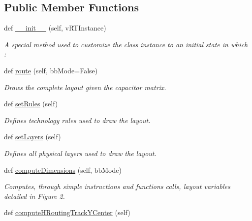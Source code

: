 \subsection*{Public Member Functions}
\begin{DoxyCompactItemize}
\item 
def \mbox{\hyperlink{classpython_1_1capacitorrouted_1_1RoutMatchedCapacitor_acb14d0c0bde8b81f13e2f4c773691d69}{\+\_\+\+\_\+init\+\_\+\+\_\+}} (self, v\+R\+T\+Instance)
\begin{DoxyCompactList}\small\item\em A special method used to customize the class instance to an initial state in which \+: \end{DoxyCompactList}\item 
def \mbox{\hyperlink{classpython_1_1capacitorrouted_1_1RoutMatchedCapacitor_a84f0757a2a026ece5364ae0cc0872ef2}{route}} (self, bb\+Mode=False)
\begin{DoxyCompactList}\small\item\em Draws the complete layout given the capacitor matrix. \end{DoxyCompactList}\item 
def \mbox{\hyperlink{classpython_1_1capacitorrouted_1_1RoutMatchedCapacitor_a458149b1404a0e797668330beb75b640}{set\+Rules}} (self)
\begin{DoxyCompactList}\small\item\em Defines technology rules used to draw the layout. \end{DoxyCompactList}\item 
def \mbox{\hyperlink{classpython_1_1capacitorrouted_1_1RoutMatchedCapacitor_a9fd411594953ae1c5be7025f258d4354}{set\+Layers}} (self)
\begin{DoxyCompactList}\small\item\em Defines all physical layers used to draw the layout. \end{DoxyCompactList}\item 
def \mbox{\hyperlink{classpython_1_1capacitorrouted_1_1RoutMatchedCapacitor_ac6ce841e559dc495eb12a6b22cf4bdf9}{compute\+Dimensions}} (self, bb\+Mode)
\begin{DoxyCompactList}\small\item\em Computes, through simple instructions and functions calls, layout variables detailed in Figure 2. \end{DoxyCompactList}\item 
def \mbox{\hyperlink{classpython_1_1capacitorrouted_1_1RoutMatchedCapacitor_ab5ada06fee186d6a8666421263c0baa6}{compute\+H\+Routing\+Track\+Y\+Center}} (self)

\end{DoxyCompactItemize}

